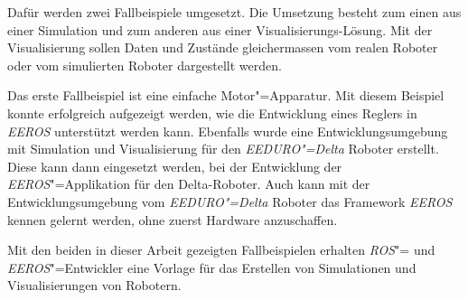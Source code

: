 Dafür werden zwei Fallbeispiele umgesetzt.
Die Umsetzung besteht zum einen aus einer Simulation und zum anderen aus einer Visualisierungs-Lösung.
Mit der Visualisierung sollen Daten und Zustände gleichermassen vom realen Roboter oder vom simulierten Roboter dargestellt werden.


Das erste Fallbeispiel ist eine einfache Motor"=Apparatur.
Mit diesem Beispiel konnte erfolgreich aufgezeigt werden, wie die Entwicklung eines Reglers in \textit{EEROS} unterstützt werden kann.
Ebenfalls wurde eine Entwicklungsumgebung mit Simulation und Visualisierung für den \textit{EEDURO"=Delta} Roboter erstellt.
Diese kann dann eingesetzt werden, bei der Entwicklung der  \textit{EEROS}"=Applikation für den Delta-Roboter.
Auch kann mit der Entwicklungsumgebung vom \textit{EEDURO"=Delta} Roboter das Framework \textit{EEROS} kennen gelernt werden, ohne zuerst Hardware anzuschaffen.


Mit den beiden in dieser Arbeit gezeigten Fallbeispielen erhalten \textit{ROS}"= und \textit{EEROS}"=Entwickler eine Vorlage für das Erstellen von Simulationen und Visualisierungen von Robotern.

